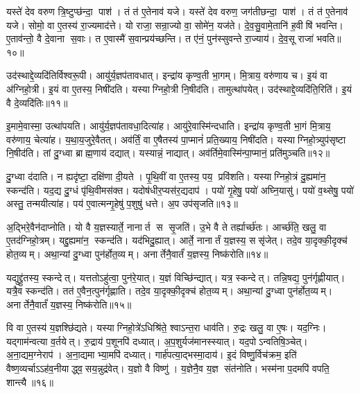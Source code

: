 यस्ते॑ देव वरुण त्रि॒ष्टुप्छ॑न्दा॒ पाश॑। तं त॑ ए॒तेनाव॑ यजे। यस्ते॑ देव वरुण॒ जग॑तीछन्दा॒ पाश॑। तं त॑ ए॒तेनाव॑ यजे। सोमो॒ वा ए॒तस्य॑ रा॒ज्यमाद॑त्ते। यो राजा॒ सन्रा॒ज्यो वा॒ सोमे॑न॒ यज॑ते। दे॒व॒सु॒वामे॒तानि॑ ह॒वीषि॑ भवन्ति। ए॒ताव॑न्तो॒ वै दे॒वाना स॒वाः। त ए॒वास्मै॑ स॒वान्प्रय॑च्छन्ति। त ए॑नं॒ पुन॑स्सुवन्ते रा॒ज्याय॑। दे॒व॒सू राजा॑ भवति॥१०॥\anuvakamend[सोम॑ आवि॒शन् य॑जे रा॒ज्यायैकं॑ च]

उद॑स्थाद्दे॒व्यदि॑तिर्विश्वरू॒पी। आयु॑र्य॒ज्ञप॑तावधात्। इन्द्रा॑य कृण्व॒ती भा॒गम्। मि॒त्राय॒ वरु॑णाय च। इ॒यं वा अ॑ग्निहो॒त्री। इ॒यं वा ए॒तस्य॒ निषी॑दति। यस्याग्निहो॒त्री नि॒षीद॑ति। तामुत्था॑पयेत्। उद॑स्थाद्दे॒व्यदि॑ति॒रिति॑। इ॒यं वै दे॒व्यदि॑तिः॥११॥

इ॒मामे॒वास्मा॒ उत्था॑पयति। आयु॑र्य॒ज्ञप॑तावधा॒दित्या॑ह। आयु॑रे॒वास्मि॑न्दधाति। इन्द्रा॑य कृण्व॒ती भा॒गं मि॒त्राय॒ वरु॑णाय॒ चेत्या॑ह। य॒था॒य॒जुरे॒वैतत्। अव॑र्तिं॒ वा ए॒षैतस्य॑ पा॒प्मानं॑ प्रति॒ख्याय॒ निषी॑दति। यस्याग्निहो॒त्र्युप॑सृष्टा नि॒षीद॑ति। तां दु॒ग्ध्वा ब्राह्म॒णाय॑ दद्यात्। यस्यान्नं॒ नाद्यात्। अव॑र्तिमे॒वास्मि॑न्पा॒प्मानं॒ प्रति॑मुञ्चति॥१२॥

दु॒ग्ध्वा द॑दाति। न ह्यदृ॑ष्टा॒ दक्षि॑णा दी॒यते। पृ॒थि॒वीं वा ए॒तस्य॒ पय॒ प्रवि॑शति। यस्याग्निहो॒त्रं दु॒ह्यमा॑न॒ स्कन्द॑ति। यद॒द्य दु॒ग्धं पृ॑थि॒वीमस॑क्त। यदोष॑धीर॒प्यस॑र॒द्यदाप॑। पयो॑ गृ॒हेषु॒ पयो॑ अघ्नि॒यासु॑। पयो॑ व॒थ्सेषु॒ पयो॑ अस्तु॒ तन्मयीत्या॑ह। पय॑ ए॒वात्मन्गृ॒हेषु॑ प॒शुषु॑ धत्ते। अ॒प उप॑सृजति॥१३॥

अ॒द्भिरे॒वैन॑दाप्नोति। यो वै य॒ज्ञस्यार्ते॒ नानार्त स सृ॒जति॑। उ॒भे वै ते तर्ह्यार्च्छ॑तः। आर्च्छ॑ति॒ खलु॒ वा ए॒तद॑ग्निहो॒त्रम्। यद्दु॒ह्यमा॑न॒ स्कन्द॑ति। यद॑भिदु॒ह्यात्। आर्ते॒ नानार्तं य॒ज्ञस्य॒ ससृ॑जेत्। तदे॒व या॒दृक्की॒दृक्च॑ होत॒व्यम्। अथा॒न्यां दु॒ग्ध्वा पुन॑र्\mbox{}होत॒व्यम्। अनार्तेनै॒वार्तं॑ य॒ज्ञस्य॒ निष्क॑रोति॥१४॥

यद्युद्द्रु॑तस्य॒ स्कन्देत्। यत्ततोऽहु॑त्वा॒ पुन॑रे॒यात्। य॒ज्ञं विच्छि॑न्द्यात्। यत्र॒ स्कन्देत्। तन्नि॒षद्य॒ पुन॑र्गृह्णीयात्। यत्रै॒व स्कन्द॑ति। तत॑ ए॒वैन॒त्पुन॑र्गृह्णाति। तदे॒व या॒दृक्की॒दृक्च॑ होत॒व्यम्। अथा॒न्यां दु॒ग्ध्वा पुन॑र्\mbox{}होत॒व्यम्। अनार्तेनै॒वार्तं॑ य॒ज्ञस्य॒ निष्क॑रोति॥१५॥

वि वा ए॒तस्य॑ य॒ज्ञश्छि॑द्यते। यस्याग्निहो॒त्रे॑ऽधिश्रि॑ते॒ श्वाऽन्त॒रा धाव॑ति। रु॒द्रः खलु॒ वा ए॒षः। यद॒ग्निः। यद्गाम॑न्वत्या व॒र्तयेत्। रु॒द्राय॑ प॒शूनपि॑ दध्यात्। अ॒प॒शुर्यज॑मानस्स्यात्। यद॒पोऽन्वतिषि॒ञ्चेत्। अ॒ना॒द्यम॒ग्नेराप॑। अ॒ना॒द्यमाभ्या॒मपि॑ दध्यात्। गार्\mbox{}ह॑पत्या॒द्भस्मा॒दाय॑। इ॒दं विष्णु॒र्विच॑क्रम॒ इति॑ वैष्ण॒व्यर्चाऽऽह॑व॒नीयाद्ध्व॒सय॒न्नुद्र॑वेत्। य॒ज्ञो वै विष्णु॑। य॒ज्ञेनै॒व य॒ज्ञ संत॑नोति। भस्म॑ना प॒दमपि॑ वपति॒ शान्त्यै॥१६॥\anuvakamend[वै दे॒व्यदि॑तिर्मुञ्चति सृजति करोति करोत्याभ्या॒मपि॑ दध्या॒त् पञ्च॑ च]

